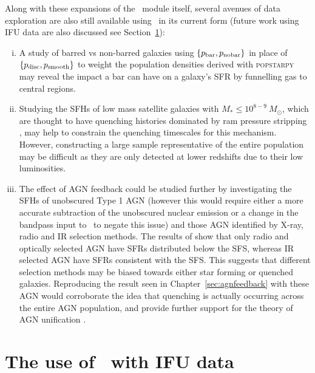 Along with these expansions of the \starpy\ module itself, several avenues of data exploration are also still available using \starpy\ in its current form (future work using IFU data are also discussed see Section~\ref{sec:IFU}):
\begin{enumerate}[(i)]

\item A study of barred vs non-barred galaxies using $\{p_{\rm{bar}}, p_{\rm{no bar}}\}$ in place of $\{p_{\rm{disc}}, p_{\rm{smooth}}\}$ to weight the population densities derived with \textsc{popstarpy} may reveal the impact a bar can have on a galaxy's SFR by funnelling gas to central regions.

\item Studying the SFHs of low mass satellite galaxies with $M_* \leq 10^{8-9} ~M_{\odot}$, which are thought to have quenching histories dominated by ram pressure stripping \citep{hester06, fillingham16}, may help to constrain the quenching timescales for this mechanism. However, constructing a large sample representative of the entire population may be difficult as they are only detected at lower redshifts due to their low luminosities. 

\item The effect of AGN feedback could be studied further by investigating the SFHs of unobscured Type 1 AGN (however this would require either a more accurate subtraction of the unobscured nuclear emission or a change in the bandpass input to \starpy\ to negate this issue) and those AGN identified by X-ray, radio and IR selection methods.  The results of \citep{ellison16} show that only radio and optically selected AGN have SFRs distributed below the SFS, whereas IR selected AGN have SFRs consistent with the SFS. This suggests that different selection methods may be biased towards either star forming or quenched galaxies. Reproducing the result seen in Chapter~\ref{sec:agnfeedback} with these AGN would corroborate the idea that quenching is actually occurring across the entire AGN population, and provide further support for the theory of AGN unification \citep{antonucci93, urry95}.

\end{enumerate}

\section{The use of \starpy\ with IFU data}\label{sec:IFU}

